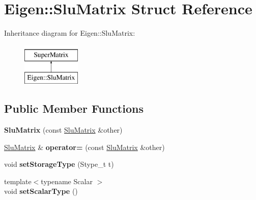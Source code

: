 \hypertarget{struct_eigen_1_1_slu_matrix}{}\section{Eigen\+::Slu\+Matrix Struct Reference}
\label{struct_eigen_1_1_slu_matrix}
Inheritance diagram for Eigen\+::Slu\+Matrix\+:\begin{figure}[H]
\begin{center}
\leavevmode
\includegraphics[height=2.000000cm]{struct_eigen_1_1_slu_matrix}
\end{center}
\end{figure}
\subsection*{Public Member Functions}
\begin{DoxyCompactItemize}
\item 
\mbox{\label{struct_eigen_1_1_slu_matrix_a60e084a9e9a1d1dfffb12e70aaf1bc09}} 
{\bfseries Slu\+Matrix} (const \mbox{\hyperlink{struct_eigen_1_1_slu_matrix}{Slu\+Matrix}} \&other)
\item 
\mbox{\label{struct_eigen_1_1_slu_matrix_a1f80eca52f85117e3b3afa29cb4ee332}} 
\mbox{\hyperlink{struct_eigen_1_1_slu_matrix}{Slu\+Matrix}} \& {\bfseries operator=} (const \mbox{\hyperlink{struct_eigen_1_1_slu_matrix}{Slu\+Matrix}} \&other)
\item 
\mbox{\label{struct_eigen_1_1_slu_matrix_ae36a82e01409ad0c3cbbf5847c096f0b}} 
void {\bfseries set\+Storage\+Type} (Stype\+\_\+t t)
\item 
\mbox{\label{struct_eigen_1_1_slu_matrix_a77c5ddf8fd6cfb5314f937976046cf46}} 
{\footnotesize template$<$typename Scalar $>$ }\\void {\bfseries set\+Scalar\+Type} ()
\end{DoxyCompactItemize}
